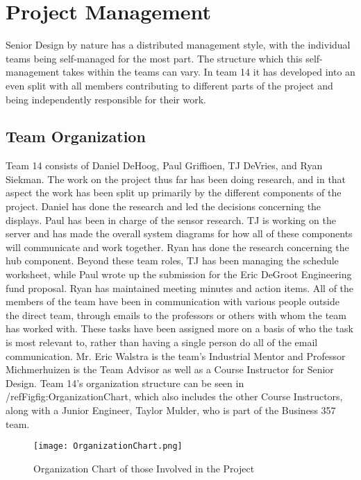\documentclass[PPFS.tex]{template/subfiles}
\begin{document}
\section{Project Management}
Senior Design by nature has a distributed management style, with the individual teams being self-managed for the most part. The structure which this self-management takes within the teams can vary. In team 14 it has developed into an even split with all members contributing to different parts of the project and being independently responsible for their work.

    \subsection{Team Organization}
	Team 14 consists of Daniel DeHoog, Paul Griffioen, TJ DeVries, and Ryan Siekman. The work on the project thus far has been doing research, and in that aspect the work has been split up primarily by the different components of the project. Daniel has done the research and led the decisions concerning the displays. Paul has been in charge of the sensor research. TJ is working on the server and has made the overall system diagrams for how all of these components will communicate and work together. Ryan has done the research concerning the hub component. Beyond these team roles, TJ has been managing the schedule worksheet, while Paul wrote up the submission for the Eric DeGroot Engineering fund proposal. Ryan has maintained meeting minutes and action items. All of the members of the team have been in communication with various people outside the direct team, through emails to the professors or others with whom the team has worked with. These tasks have been assigned more on a basis of who the task is most relevant to, rather than having a single person do all of the email communication. Mr. Eric Walstra is the team's Industrial Mentor and Professor Michmerhuizen is the Team Advisor as well as a Course Instructor for Senior Design. Team 14's organization structure can be seen in /refFig{fig:OrganizationChart}, which also includes the other Course Instructors, along with a Junior Engineer, Taylor Mulder, who is part of the Business 357 team.
	
	\begin{figure}[h]
		\centering
		\texttt{[image: OrganizationChart.png]}
		\caption{Organization Chart of those Involved in the Project}
		\label{fig:OrganizationChart}
	\end{figure}
	
\end{document}
